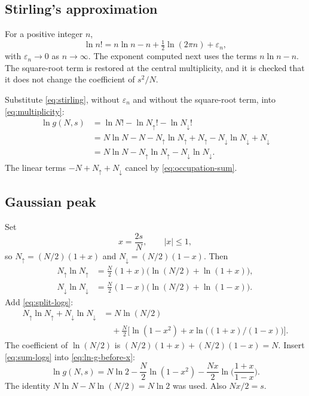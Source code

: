 \subsection{Stirling's approximation}

For a positive integer \(n\),
\begin{equation}
\label{eq:stirling}
\ln n! = n\ln n - n + \tfrac{1}{2}\ln(2\pi n) + \varepsilon_n,
\end{equation}
with \(\varepsilon_n \to 0\) as \(n\to\infty\). The exponent computed next uses the terms \(n\ln n - n\). The square-root term is restored at the central multiplicity, and it is checked that it does not change the coefficient of \(s^2/N\).

Substitute \eqref{eq:stirling}, without \(\varepsilon_n\) and without the square-root term, into \eqref{eq:multiplicity}:
\begin{align}
\ln g(N,s)
&= \ln N! - \ln N_{\uparrow}! - \ln N_{\downarrow}! \nonumber\\
&= N\ln N - N
 - N_{\uparrow}\ln N_{\uparrow} + N_{\uparrow}
 - N_{\downarrow}\ln N_{\downarrow} + N_{\downarrow} \nonumber\\
&= N\ln N - N_{\uparrow}\ln N_{\uparrow} - N_{\downarrow}\ln N_{\downarrow}.
\label{eq:ln-g-before-x}
\end{align}
The linear terms \(-N + N_{\uparrow} + N_{\downarrow}\) cancel by \eqref{eq:occupation-sum}.

\subsection{Gaussian peak}

Set
\begin{equation}
\label{eq:x-def}
x = \frac{2s}{N},
\qquad
|x| \le 1,
\end{equation}
so \(N_{\uparrow} = (N/2)(1+x)\) and \(N_{\downarrow} = (N/2)(1-x)\). Then
\begin{align}
N_{\uparrow}\ln N_{\uparrow}
&= \frac{N}{2}(1+x)\bigl(\ln(N/2) + \ln(1+x)\bigr), \nonumber\\
N_{\downarrow}\ln N_{\downarrow}
&= \frac{N}{2}(1-x)\bigl(\ln(N/2) + \ln(1-x)\bigr).
\label{eq:split-logs}
\end{align}
Add \eqref{eq:split-logs}:
\begin{align}
N_{\uparrow}\ln N_{\uparrow} + N_{\downarrow}\ln N_{\downarrow}
&= N\ln(N/2) \nonumber\\
&\quad + \frac{N}{2}\bigl[\ln(1-x^2) + x\ln\bigl((1+x)/(1-x)\bigr)\bigr].
\label{eq:sum-logs}
\end{align}
The coefficient of \(\ln(N/2)\) is \((N/2)(1+x) + (N/2)(1-x) = N\). Insert \eqref{eq:sum-logs} into \eqref{eq:ln-g-before-x}:
\begin{equation}
\label{eq:ln-g-exact-stirling}
\ln g(N,s)
= N\ln 2
- \frac{N}{2}\ln(1-x^2)
- \frac{Nx}{2}\ln\biggl(\frac{1+x}{1-x}\biggr).
\end{equation}
The identity \(N\ln N - N\ln(N/2) = N\ln 2\) was used. Also \(Nx/2 = s\).

